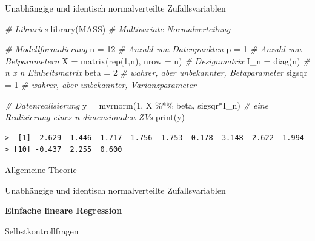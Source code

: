 \documentclass[
  8pt,
  ignorenonframetext,
]{beamer}
\newenvironment{Shaded}{\begin{snugshade}}{\end{snugshade}}
\newcommand{\AttributeTok}[1]{\textcolor[rgb]{0.77,0.63,0.00}{#1}}
\newcommand{\CommentTok}[1]{\textcolor[rgb]{0.56,0.35,0.01}{\textit{#1}}}
\newcommand{\DecValTok}[1]{\textcolor[rgb]{0.00,0.00,0.81}{#1}}
\newcommand{\FunctionTok}[1]{\textcolor[rgb]{0.00,0.00,0.00}{#1}}
\newcommand{\NormalTok}[1]{#1}
\newcommand{\OtherTok}[1]{\textcolor[rgb]{0.56,0.35,0.01}{#1}}
\newcommand{\SpecialCharTok}[1]{\textcolor[rgb]{0.00,0.00,0.00}{#1}}
\begin{document}
\begin{frame}[fragile]{Unabhängige und identisch normalverteilte
Zufallsvariablen}
\protect\hypertarget{unabhuxe4ngige-und-identisch-normalverteilte-zufallsvariablen-1}{}
\footnotesize

\begin{Shaded}
\begin{Highlighting}[]
\CommentTok{\# Libraries }
\FunctionTok{library}\NormalTok{(MASS)                                }\CommentTok{\# Multivariate Normalverteilung}

\CommentTok{\# Modellformulierung}
\NormalTok{n      }\OtherTok{=} \DecValTok{12}                                  \CommentTok{\# Anzahl von Datenpunkten}
\NormalTok{p      }\OtherTok{=} \DecValTok{1}                                   \CommentTok{\# Anzahl von Betparametern}
\NormalTok{X      }\OtherTok{=} \FunctionTok{matrix}\NormalTok{(}\FunctionTok{rep}\NormalTok{(}\DecValTok{1}\NormalTok{,n), }\AttributeTok{nrow =}\NormalTok{ n)          }\CommentTok{\# Designmatrix}
\NormalTok{I\_n    }\OtherTok{=} \FunctionTok{diag}\NormalTok{(n)                             }\CommentTok{\# n x n Einheitsmatrix}
\NormalTok{beta   }\OtherTok{=} \DecValTok{2}                                   \CommentTok{\# wahrer, aber unbekannter, Betaparameter}
\NormalTok{sigsqr }\OtherTok{=} \DecValTok{1}                                   \CommentTok{\# wahrer, aber unbekannter, Varianzparameter}

\CommentTok{\# Datenrealisierung}
\NormalTok{y      }\OtherTok{=} \FunctionTok{mvrnorm}\NormalTok{(}\DecValTok{1}\NormalTok{, X }\SpecialCharTok{\%*\%}\NormalTok{ beta, sigsqr}\SpecialCharTok{*}\NormalTok{I\_n)  }\CommentTok{\# eine Realisierung eines n{-}dimensionalen ZVs}
\FunctionTok{print}\NormalTok{(y)}
\end{Highlighting}
\end{Shaded}

\begin{verbatim}
>  [1]  2.629  1.446  1.717  1.756  1.753  0.178  3.148  2.622  1.994
> [10] -0.437  2.255  0.600
\end{verbatim}
\end{frame}

\begin{frame}{}
\protect\hypertarget{section-5}{}
\large
{}
\vfill

Allgemeine Theorie

Unabhängige und identisch normalverteilte Zufallsvariablen

\textbf{Einfache lineare Regression}

Selbstkontrollfragen \vfill
\end{frame}
\end{document}
